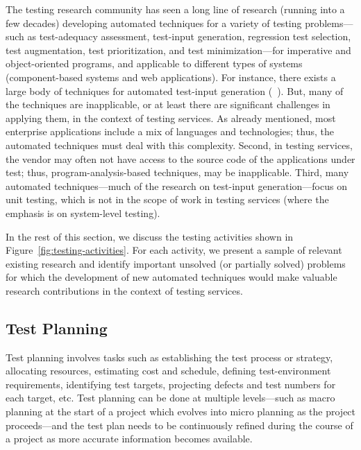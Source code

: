 The testing research community has seen a long line of research (running into a
few decades) developing automated techniques for a variety of testing
problems---such as test-adequacy assessment, test-input generation, regression
test selection, test augmentation, test prioritization, and test
minimization---for imperative and object-oriented programs, and applicable to
different types of systems (\eg component-based systems and web
applications). For instance, there exists a large body of techniques for
automated test-input generation (\eg ~\cite{Artzi:2011, Boyapati:2002, cadar08,
  Clarke:1976, Ferguson:1996, godefroid05, Gross:2012, Harman:2010, king76jul,
  korel90aug, Pacheco:2007, sen05, thummalapenta:2011, Tillmann:2005,
  visser04}).  But, many of the techniques are inapplicable, or at least there
are significant challenges in applying them, in the context of testing
services. As already mentioned, most enterprise applications include a mix of
languages and technologies; thus, the automated techniques must deal with this
complexity. Second, in testing services, the vendor may often not have access to
the source code of the applications under test; thus, program-analysis-based
techniques, may be inapplicable. Third, many automated techniques---\eg much of
the research on test-input generation---focus on unit testing, which is not in
the scope of work in testing services (where the emphasis is on system-level
testing).

In the rest of this section, we discuss the testing activities shown in
Figure~\ref{fig:testing-activities}. For each activity, we present a sample of
relevant existing research and identify important unsolved (or partially solved)
problems for which the development of new automated techniques would make
valuable research contributions in the context of testing services.

\subsection{Test Planning}
\label{sec:test-planning}

Test planning involves tasks such as establishing the test process or strategy,
allocating resources, estimating cost and schedule, defining test-environment
requirements, identifying test targets, projecting defects and test numbers for
each target, etc.  Test planning can be done at multiple levels---such as macro
planning at the start of a project which evolves into micro planning as the
project proceeds---and the test plan needs to be continuously refined during the
course of a project as more accurate information becomes available.

